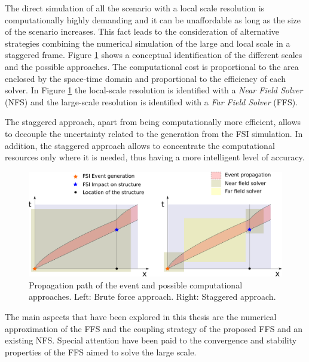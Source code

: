 The direct simulation of all the scenario with a local scale resolution is computationally highly demanding and it can be unaffordable as long as the size of the scenario increases. This fact leads to the consideration of alternative strategies combining the numerical simulation of the large and local scale in a staggered frame. Figure \ref{space_time_staggered_approach} shows a conceptual identification of the different scales and the possible approaches. The computational cost is proportional to the area enclosed by the space-time domain and proportional to the efficiency of each solver. In Figure \ref{space_time_staggered_approach} the local-scale resolution is identified with a \emph{Near Field Solver} (NFS) and the large-scale resolution is identified with a \emph{Far Field Solver} (FFS).

The staggered approach, apart from being computationally more efficient, allows to decouple the uncertainty related to the generation from the FSI simulation. In addition, the staggered approach allows to concentrate the computational resources only where it is needed, thus having a more intelligent level of accuracy.


\begin{figure}
    \centering
    \includegraphics[width=\textwidth]{img/coupling/space_time}
    \caption{Propagation path of the event and possible computational approaches. Left: Brute force approach. Right: Staggered approach.}
    \label{space_time_staggered_approach}
\end{figure}


The main aspects that have been explored in this thesis are the numerical approximation of the FFS and the coupling strategy of the proposed FFS and an existing NFS. Special attention have been paid to the convergence and stability properties of the FFS aimed to solve the large scale.





